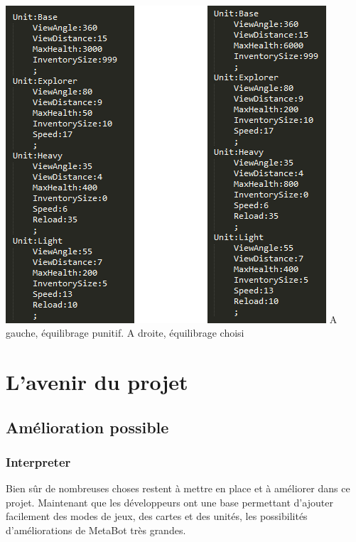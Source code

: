 \documentclass{report}
\begin{document}
\paragraph{}
\begin{adjustwidth}{-3em}{}
\begin{center}
\includegraphics[scale=1]{DATA/EquilibrageComp.png}
 {A gauche, équilibrage punitif. A droite, équilibrage choisi}
\end{center}
\end{adjustwidth}
\paragraph{}


\newpage

\part{L'avenir du projet}
\chapter{Amélioration possible}
\section{Interpreter}
Bien sûr de nombreuses choses restent à mettre en place et à améliorer dans ce projet. Maintenant que les développeurs ont une base permettant d’ajouter facilement des modes de jeux, des cartes et des unités, les possibilités d’améliorations de MetaBot très grandes. 
\end{document}
